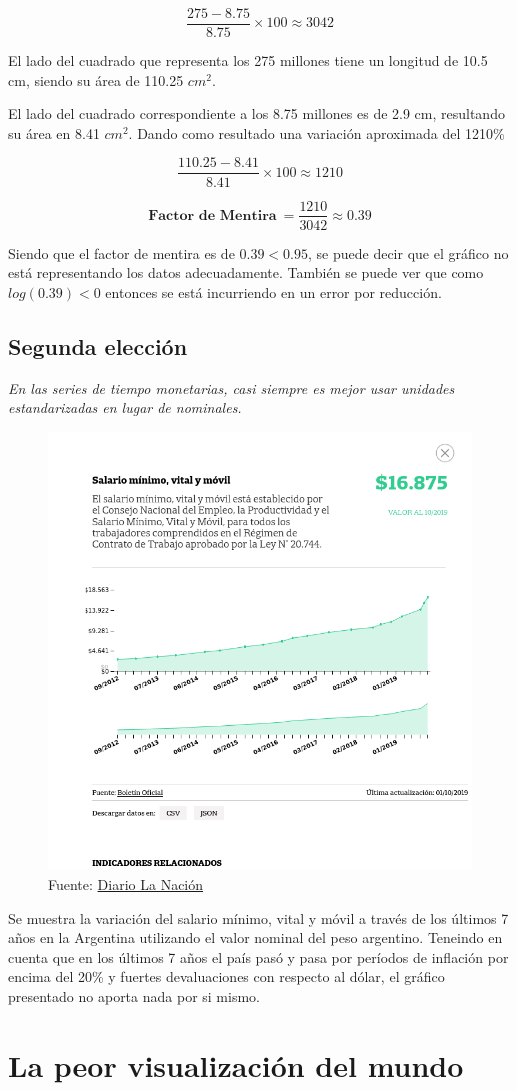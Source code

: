 \documentclass[
	12pt, %
	spanish, %
]{fphw}
\begin{document}
$$ \dfrac{275 - 8.75}{8.75} \times 100  \approx 3042$$

El lado del cuadrado que representa los 275 millones tiene un longitud de 10.5 cm, siendo su área de 110.25 $cm^{2}$.

El lado del cuadrado correspondiente a los 8.75 millones es de 2.9 cm, resultando su área en 8.41 $cm^{2}$. Dando como resultado una variación aproximada del 1210\%

$$ \dfrac{110.25 - 8.41}{8.41} \times 100  \approx 1210$$


$$ \textbf{Factor de Mentira}\ = \dfrac{1210}{3042} \approx \boxed{0.39} $$

Siendo que el factor de mentira es de $\textit{0.39} < 0.95$, se puede decir que el gráfico no está representando los datos adecuadamente. También se puede ver que como $log(0.39) < 0$ entonces se está incurriendo en un error por reducción.

\subsection*{Segunda elección}
\textit{En las series de tiempo monetarias, casi siempre es mejor usar unidades estandarizadas en lugar de nominales.}

\begin{figure}[h]
\begin{center}
	\includegraphics[width=0.7\columnwidth,keepaspectratio]{lanacion-salirio-minimo.png}
	\caption*{Fuente: \href{https://www.lanacion.com.ar}{Diario La Nación}}
\end{center}
\end{figure}

Se muestra la variación del salario mínimo, vital y móvil a través de los últimos 7 años en la Argentina utilizando el valor nominal del peso argentino. Teneindo en cuenta que en los últimos 7 años el país pasó y pasa por períodos de inflación por encima del 20\% y fuertes devaluaciones con respecto al dólar, el gráfico presentado no aporta nada por si mismo.

\newpage

\section*{La peor visualización del mundo}
\end{document}
